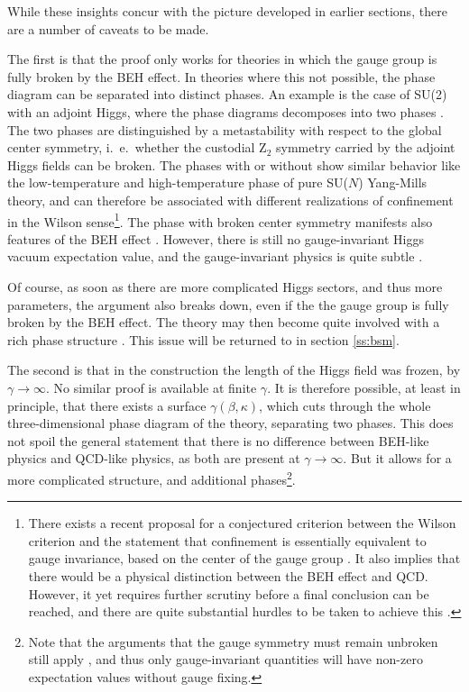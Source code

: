 \documentclass[final,12pt,3p,longtitle]{elsarticle}
\newcommand*{\1}{1\!\!\!\bot}
\begin{document}
While these insights concur with the picture developed in earlier sections, there are a number of caveats to be made.

The first is that the proof only works for theories in which the gauge group is fully broken by the BEH effect. In theories where this not possible, the phase diagram can be separated into distinct phases. An example is the case of SU(2) with an adjoint Higgs, where the phase diagrams decomposes into two phases \cite{Baier:1986ni}. The two phases are distinguished by a metastability with respect to the global center symmetry, i.\ e.\ whether the custodial Z$_2$ symmetry carried by the adjoint Higgs fields can be broken. The phases with or without show similar behavior like the low-temperature and high-temperature phase of pure SU($N$) Yang-Mills theory, and can therefore be associated with different realizations of confinement in the Wilson sense\footnote{There exists a recent proposal for a conjectured criterion between the Wilson criterion and the statement that confinement is essentially equivalent to gauge invariance, based on the center of the gauge group \cite{Greensite:2017ajx}. It also implies that there would be a physical distinction between the BEH effect and QCD. However, it yet requires further scrutiny before a final conclusion can be reached, and there are quite substantial hurdles to be taken to achieve this \cite{Seiler:2015rwa}.}. The phase with broken center symmetry manifests also features of the BEH effect \cite{Lang:1981qg,Drouffe:1984hb,Baier:1986ni,Capri:2012cr}. However, there is still no gauge-invariant Higgs vacuum expectation value, and the gauge-invariant physics is quite subtle \cite{Maas:2017xzh,Kondo:2016ywd}.

Of course, as soon as there are more complicated Higgs sectors, and thus more parameters, the argument also breaks down, even if the the gauge group is fully broken by the BEH effect. The theory may then become quite involved with a rich phase structure \cite{Branco:2011iw,Ivanov:2017dad,Lewis:2010ps,Maas:2016qpu,Maas:2014nya}. This issue will be returned to in section \ref{ss:bsm}.

The second is that in the construction the length of the Higgs field was frozen, by $\gamma\to\infty$. No similar proof is available at finite $\gamma$. It is therefore possible, at least in principle, that there exists a surface $\gamma(\beta,\kappa)$, which cuts through the whole three-dimensional phase diagram of the theory, separating two phases. This does not spoil the general statement that there is no difference between BEH-like physics and QCD-like physics, as both are present at $\gamma\to\infty$. But it allows for a more complicated structure, and additional phases\footnote{Note that the arguments that the gauge symmetry must remain unbroken still apply \cite{Elitzur:1975im,Haag:1992hx}, and thus only gauge-invariant quantities will have non-zero expectation values without gauge fixing.}.
\end{document}
